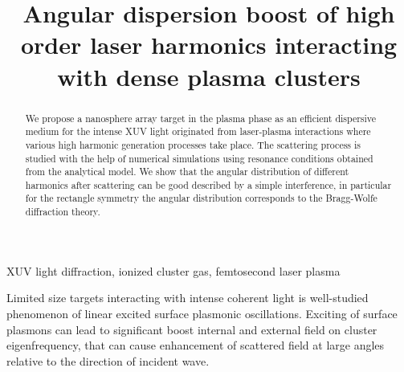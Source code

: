 \documentclass[conference]{IEEEtran}
\begin{document}
\renewcommand*{\figureautorefname}{Fig.}
\renewcommand*{\equationautorefname}{Eq.}






\title{Angular dispersion boost of high order laser harmonics interacting with dense plasma clusters}

\author{
}


\maketitle

\begin{abstract}%
	 We propose a nanosphere array target in the plasma phase as an efficient dispersive medium for the intense XUV light originated from laser-plasma interactions where various high harmonic generation processes take place. The scattering process is studied with the help of numerical simulations using resonance conditions obtained from the analytical model. We show that the angular distribution of different harmonics after scattering can be good described by a simple interference, in particular for the rectangle symmetry the angular distribution corresponds to the Bragg-Wolfe diffraction theory.
\end{abstract}

\begin{IEEEkeywords}
	XUV light diffraction, ionized cluster gas, femtosecond laser plasma
\end{IEEEkeywords}


Limited size targets interacting with intense coherent light is well-studied phenomenon of linear excited surface plasmonic oscillations. Exciting of surface plasmons can lead to significant boost internal and external field on cluster eigenfrequency, that can cause enhancement of scattered field at large angles relative to the direction of incident wave.
\end{document}
